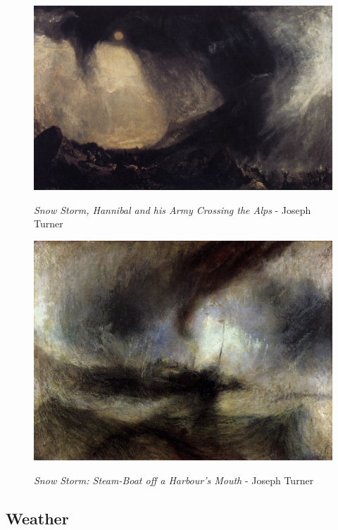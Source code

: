 \documentclass[a4paper]{article}
\begin{document}
\begin {figure}[h!]
\centering
\begin{minipage}[b]{.49\textwidth}
	\centering
	\includegraphics[width=\textwidth]{SnowPaintings/_Ext__turnersnowstormhannibalandhisarmycrossingthealps.jpg}
    \caption{\emph{Snow Storm, Hannibal and his Army Crossing the Alps} - Joseph Turner}
\end{minipage}
\hfill
\begin{minipage}[b]{.49\textwidth}
	\centering
	\includegraphics[width=\textwidth]{SnowPaintings/_Ext__josephmallordwilliamturnersnowstorm.jpg}
    \caption{\emph{Snow Storm: Steam-Boat off a Harbour's Mouth} - Joseph Turner}
\end{minipage}
\end{figure}

\newpage
\subsection{Weather}
\end{document}
